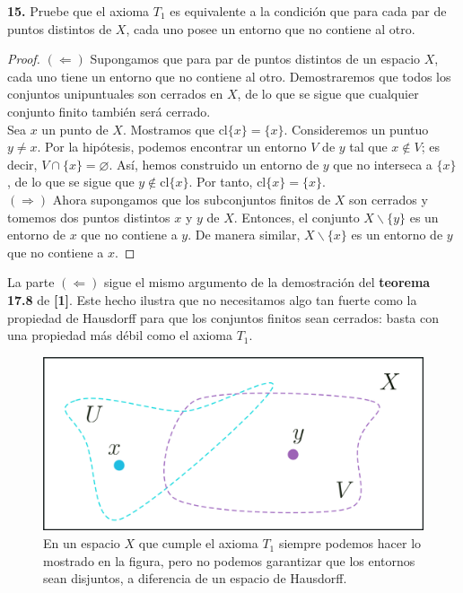 \documentclass{article}
\begin{document}
\begin{mybox}
	\textbf{15. } Pruebe que el axioma $T_{1}$ es equivalente a la condición que para cada par de puntos distintos de $X$, cada uno posee un entorno que no contiene al otro. 
\end{mybox}	
\begin{proof}
	$(\Leftarrow)$ Supongamos que para par de puntos distintos de un espacio $X$, cada uno tiene un entorno que no contiene al otro. Demostraremos que todos los conjuntos unipuntuales son cerrados en $X$, de lo que se sigue que cualquier conjunto finito también será cerrado. \\
	Sea $x$ un punto de $X$. Mostramos que $\text{cl}\{x\} = \{x\}$. Consideremos un puntuo $y \neq x$. Por la hipótesis, podemos encontrar un entorno $V$ de $y$ tal que $x \notin V$; es decir, $V \cap \{x\} = \varnothing$. Así, hemos construido un entorno de $y$ que no interseca a $\{ x \}$, de lo que se sigue que $y \notin \text{cl}\{x\}$. Por tanto, $\text{cl}\{x\} = \{x\}$. \\
	$(\Rightarrow)$ Ahora supongamos que los subconjuntos finitos de $X$ son cerrados y tomemos dos puntos distintos $x$ y $y$ de $X$. Entonces, el conjunto $X \backslash \{y\}$ es un entorno de $x$ que no contiene a $y$. De manera similar, $X \backslash \{ x \}$ es un entorno de $y$ que no contiene a $x$.
\end{proof}
La parte $(\Leftarrow)$ sigue el mismo argumento de la demostración del \textbf{teorema 17.8} de \textbf{[1]}. Este hecho ilustra que no necesitamos algo tan fuerte como la propiedad de Hausdorff para que los conjuntos finitos sean cerrados: basta con una propiedad más débil como el axioma $T_{1}$. 
\newpage
\begin{figure}[h]
	\centering \includegraphics[scale=0.15]{e2fig.png}
	\caption{En un espacio $X$ que cumple el axioma $T_{1}$ siempre podemos hacer lo mostrado en la figura, pero no podemos garantizar que los entornos sean disjuntos, a diferencia de un espacio de Hausdorff. }
\end{figure}
\end{document}
